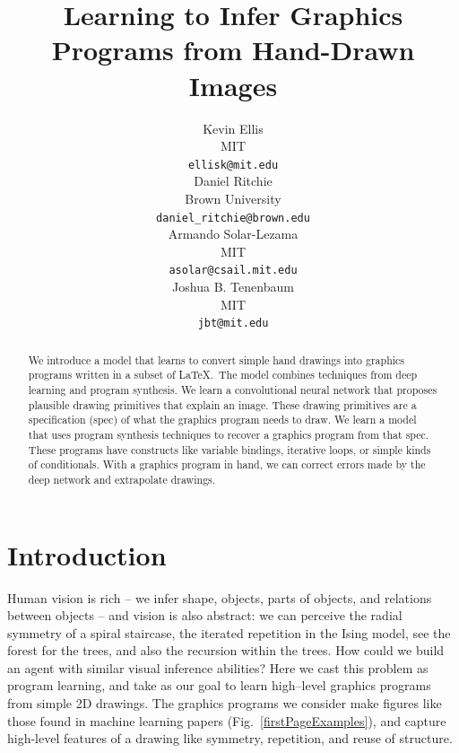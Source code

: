 \documentclass{article}
\title{Learning to Infer Graphics Programs from Hand-Drawn Images}
\author{Kevin Ellis\\
  MIT\\
  \texttt{ellisk@mit.edu} \\
  \And
  Daniel Ritchie\\
Brown University\\
 \texttt{daniel\_ritchie@brown.edu} \\
 \And
 Armando Solar-Lezama\\
 MIT\\
\texttt{asolar@csail.mit.edu} \\
\And
Joshua B. Tenenbaum \\
MIT\\
\texttt{jbt@mit.edu}
}
\theoremstyle{definition}
\begin{document}

\maketitle

\begin{abstract}
  We introduce a model that learns to convert simple hand drawings
  into graphics programs written in a subset of \LaTeX.~The model
  combines techniques from deep learning and program synthesis.  We
  learn a convolutional neural network that proposes plausible drawing
  primitives that explain an image. These drawing primitives are a
  specification (spec) of what the graphics program needs to draw.
  We learn a model that uses program synthesis techniques to
  recover a graphics program from that spec. These programs have
  constructs like variable bindings, iterative loops, or simple kinds
  of conditionals. With a graphics program in hand, we can correct
  errors made by the deep network and extrapolate drawings.  %
\end{abstract}

\section{Introduction}

Human vision is rich -- we infer shape, objects, parts of objects,
and relations between objects -- and vision is also abstract:
we can perceive the radial symmetry of a spiral staircase,
the iterated repetition in the Ising model,
see the forest for the trees, and also the recursion within the trees.
How could we build an agent with similar visual inference abilities?
Here we
cast this problem as program learning,
and take as our goal to learn high--level
graphics programs from simple 2D drawings.
The graphics programs we consider make figures like those found in machine learning papers
(Fig.~\ref{firstPageExamples}),
and capture high-level features of a drawing like
symmetry, repetition, and reuse of structure.

\end{document}
